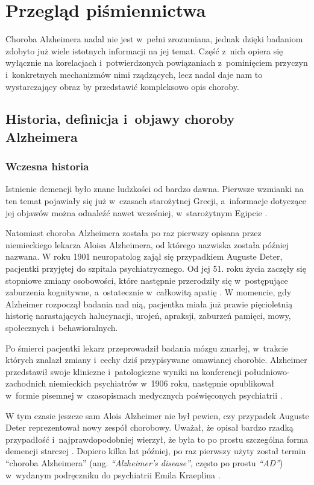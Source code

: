 \chapter{Przegląd piśmiennictwa}

Choroba Alzheimera nadal nie jest w~pełni zrozumiana, jednak dzięki badaniom zdobyto już wiele istotnych informacji na jej temat.
Część z~nich opiera się wyłącznie na korelacjach i~potwierdzonych powiązaniach z~pominięciem przyczyn i~konkretnych mechanizmów nimi rządzących, lecz nadal daje nam to wystarczający obraz by przedstawić kompleksowo opis choroby.

\section{Historia, definicja i~objawy choroby Alzheimera}

\subsection{Wczesna historia}

Istnienie demencji było znane ludzkości od bardzo dawna.
Pierwsze wzmianki na ten temat pojawiały się już w~czasach starożytnej Grecji, a~informacje dotyczące jej objawów można odnaleźć nawet wcześniej, w~starożytnym Egipcie \cite{boller1998history}.

Natomiast choroba Alzheimera została po raz pierwszy opisana przez niemieckiego lekarza Aloisa Alzheimera, od którego nazwiska została później nazwana.
W roku 1901 neuropatolog zajął się przypadkiem Auguste Deter, pacjentki przyjętej do szpitala psychiatrycznego.
Od jej 51. roku życia zaczęły się stopniowe zmiany osobowości, które następnie przerodziły się w~postępujące zaburzenia kognitywne, a~ostatecznie w~całkowitą apatię \cite{cipriani2011alzheimer}.
W momencie, gdy Alzheimer rozpoczął badania nad nią, pacjentka miała już prawie pięcioletnią historię narastających halucynacji, urojeń, apraksji, zaburzeń pamięci, mowy, społecznych i~behawioralnych.

Po śmierci pacjentki lekarz przeprowadził badania mózgu zmarłej, w~trakcie których znalazł zmiany i~cechy dziś przypisywane omawianej chorobie.
Alzheimer przedstawił swoje kliniczne i~patologiczne wyniki na konferencji południowo-zachodnich niemieckich psychiatrów w~1906 roku, następnie opublikował w~formie pisemnej w~czasopismach medycznych poświęconych psychiatrii \cite{alzheimer1906uber}.

W tym czasie jeszcze sam Alois Alzheimer nie był pewien, czy przypadek Auguste Deter reprezentował nowy zespół chorobowy.
Uważał, że opisał bardzo rzadką przypadłość i~najprawdopodobniej wierzył, że była to po prostu szczególna forma demencji starczej \cite{cipriani2011alzheimer}.
Dopiero kilka lat później, po raz pierwszy użyty został termin ``choroba Alzheimera'' (ang. \emph{``Alzheimer's disease''}, często po prostu \emph{``AD''}) w~wydanym podręczniku do psychiatrii Emila Kraeplina \cite{kraepelin1910psychiatrie}.

